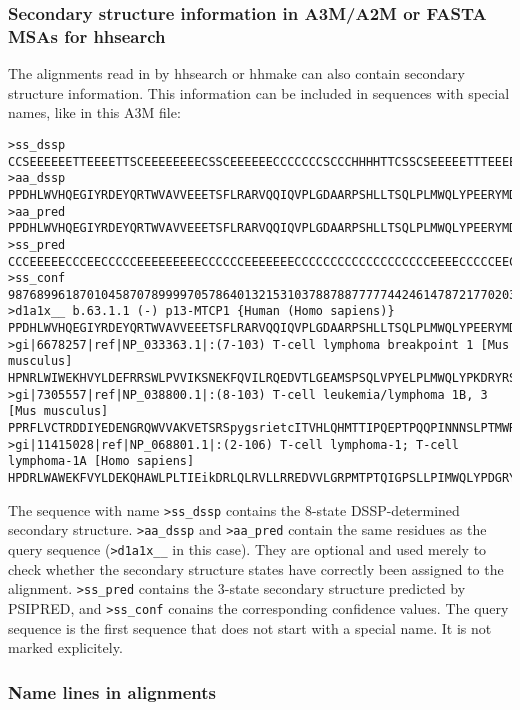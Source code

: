 \documentclass[11pt,a4paper]{article}
\begin{document}
\subsubsection*{Secondary structure information in A3M/A2M or FASTA MSAs for hhsearch}

The alignments read in by hhsearch or hhmake can also contain secondary structure 
information. This information can be included in sequences with special names, 
like in this A3M file:

\scriptsize\begin{verbatim}
>ss_dssp
CCSEEEEEETTEEEETTSCEEEEEEEECSSCEEEEEECCCCCCCSCCCHHHHTTCSSCSEEEEETTTEEEETTSC
>aa_dssp
PPDHLWVHQEGIYRDEYQRTWVAVVEEETSFLRARVQQIQVPLGDAARPSHLLTSQLPLMWQLYPEERYMDNNSR
>aa_pred 
PPDHLWVHQEGIYRDEYQRTWVAVVEEETSFLRARVQQIQVPLGDAARPSHLLTSQLPLMWQLYPEERYMDNNSR
>ss_pred 
CCCEEEEECCCEECCCCCEEEEEEEEECCCCCCEEEEEEECCCCCCCCCCCCCCCCCCCEEEECCCCCEECCCCC
>ss_conf 
987689961870104587078999970578640132153103788788777774424614787217702035631
>d1a1x__ b.63.1.1 (-) p13-MTCP1 {Human (Homo sapiens)}
PPDHLWVHQEGIYRDEYQRTWVAVVEEETSFLRARVQQIQVPLGDAARPSHLLTSQLPLMWQLYPEERYMDNNSR
>gi|6678257|ref|NP_033363.1|:(7-103) T-cell lymphoma breakpoint 1 [Mus musculus]
HPNRLWIWEKHVYLDEFRRSWLPVVIKSNEKFQVILRQEDVTLGEAMSPSQLVPYELPLMWQLYPKDRYRSCDSM
>gi|7305557|ref|NP_038800.1|:(8-103) T-cell leukemia/lymphoma 1B, 3 [Mus musculus]
PPRFLVCTRDDIYEDENGRQWVVAKVETSRSpygsrietcITVHLQHMTTIPQEPTPQQPINNNSLPTMWRLESMNTYTGTDGT
>gi|11415028|ref|NP_068801.1|:(2-106) T-cell lymphoma-1; T-cell lymphoma-1A [Homo sapiens]
HPDRLWAWEKFVYLDEKQHAWLPLTIEikDRLQLRVLLRREDVVLGRPMTPTQIGPSLLPIMWQLYPDGRYRSSDSS
\end{verbatim}\normalsize

The sequence with name \verb`>ss_dssp` contains the 8-state DSSP-determined secondary
structure. \verb`>aa_dssp` and \verb`>aa_pred` contain the same residues as the query 
sequence 
(\verb`>d1a1x__` in this case). They are optional and used merely to check whether the 
secondary structure states have correctly been assigned to the alignment. \verb`>ss_pred` 
contains the 3-state secondary structure predicted by PSIPRED, and \verb`>ss_conf`
 conains 
the corresponding confidence values. The query sequence is the first sequence that 
does not start with a special name. It is not marked explicitely.


\subsubsection*{Name lines in alignments}
\end{document}
